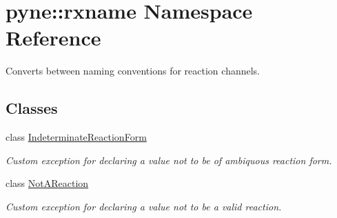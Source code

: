 \hypertarget{namespacepyne_1_1rxname}{}\section{pyne\+:\+:rxname Namespace Reference}
\label{namespacepyne_1_1rxname}


Converts between naming conventions for reaction channels.  


\subsection*{Classes}
\begin{DoxyCompactItemize}
\item 
class \hyperlink{classpyne_1_1rxname_1_1_indeterminate_reaction_form}{Indeterminate\+Reaction\+Form}
\begin{DoxyCompactList}\small\item\em Custom exception for declaring a value not to be of ambiquous reaction form. \end{DoxyCompactList}\item 
class \hyperlink{classpyne_1_1rxname_1_1_not_a_reaction}{Not\+A\+Reaction}
\begin{DoxyCompactList}\small\item\em Custom exception for declaring a value not to be a valid reaction. \end{DoxyCompactList}\end{DoxyCompactItemize}
